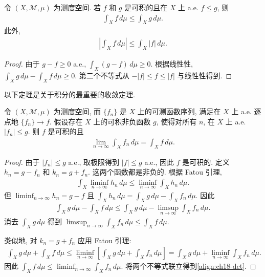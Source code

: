 \documentclass[../../main.tex]{subfiles}
\begin{document}
\begin{proposition}[积分的比较判别法]\label{proposition:ch18-comparison}
令 $(X,\mathcal{M},\mu)$ 为测度空间. 若 $f$ 和 $g$ 是可积的且在 $X$ 上 a.e. $f\leqslant g$, 则
\begin{align*}
\int_{X}f\,d\mu\leqslant\int_{X}g\,d\mu.
\end{align*}
此外,
\begin{align*}
\left|\int_{X}f\,d\mu\right|\leqslant\int_{X}|f|\,d\mu.
\end{align*}
\end{proposition}

\begin{proof}
由于 $g-f\geqslant 0$ a.e., $\int_{X}(g-f)\,d\mu\geqslant 0$. 根据线性性, $\int_{X}g\,d\mu-\int_{X}f\,d\mu\geqslant 0$. 第二个不等式从 $-|f|\leqslant f\leqslant|f|$ 与线性性得到.
\end{proof}

以下定理是关于积分的最重要的收敛定理.

\begin{theorem}\label{theorem:ch18-dct}
令 $(X,\mathcal{M},\mu)$ 为测度空间, 而 $\{f_{n}\}$ 是 $X$ 上的可测函数序列, 满足在 $X$ 上 a.e. 逐点地 $\{f_{n}\}\to f$. 假设存在 $X$ 上的可积非负函数 $g$, 使得对所有 $n$, 在 $X$ 上 a.e. $|f_{n}|\leqslant g$. 则 $f$ 是可积的且
\begin{align}
\lim_{n\to\infty}\int_{X}f_{n}\,d\mu=\int_{X}f\,d\mu.\label{align:ch18-dct}
\end{align}
\end{theorem}

\begin{proof}
由于 $|f_{n}|\leqslant g$ a.e., 取极限得到 $|f|\leqslant g$ a.e., 因此 $f$ 是可积的. 定义 $h_{n}=g-f_{n}$ 和 $k_{n}=g+f_{n}$. 这两个函数都是非负的. 根据 Fatou 引理,
\begin{align*}
\int_{X}\liminf_{n\to\infty}h_{n}\,d\mu\leqslant\liminf_{n\to\infty}\int_{X}h_{n}\,d\mu.
\end{align*}
但 $\liminf_{n\to\infty}h_{n}=g-f$ 且 $\int_{X}h_{n}\,d\mu=\int_{X}g\,d\mu-\int_{X}f_{n}\,d\mu$. 因此
\begin{align*}
\int_{X}g\,d\mu-\int_{X}f\,d\mu\leqslant\int_{X}g\,d\mu-\limsup_{n\to\infty}\int_{X}f_{n}\,d\mu.
\end{align*}
消去 $\int_{X}g\,d\mu$ 得到 $\limsup_{n\to\infty}\int_{X}f_{n}\,d\mu\leqslant\int_{X}f\,d\mu$.

类似地, 对 $k_{n}=g+f_{n}$ 应用 Fatou 引理:
\begin{align*}
\int_{X}g\,d\mu+\int_{X}f\,d\mu\leqslant\liminf_{n\to\infty}\left[\int_{X}g\,d\mu+\int_{X}f_{n}\,d\mu\right]=\int_{X}g\,d\mu+\liminf_{n\to\infty}\int_{X}f_{n}\,d\mu.
\end{align*}
因此 $\int_{X}f\,d\mu\leqslant\liminf_{n\to\infty}\int_{X}f_{n}\,d\mu$. 将两个不等式联立得到\eqref{align:ch18-dct}.
\end{proof}
\end{document}
